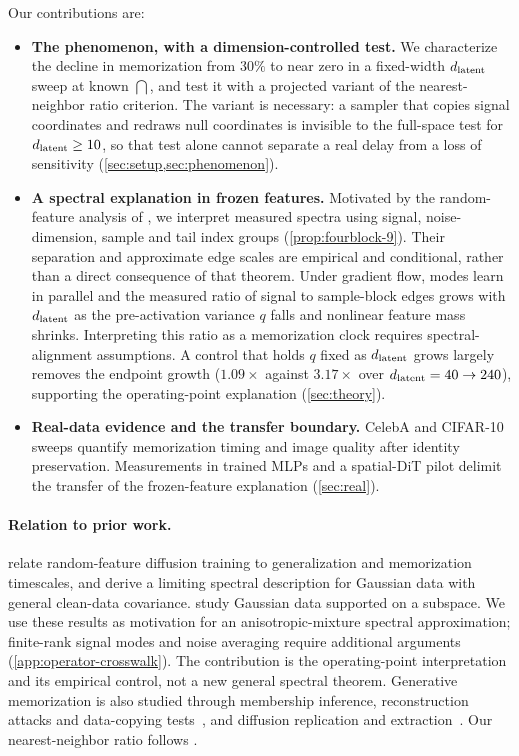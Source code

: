 Our contributions are:
\begin{itemize}
  \item \textbf{The phenomenon, with a dimension-controlled test.} We characterize the decline in memorization from $30\%$ to near zero in a fixed-width $d_{\mathrm{latent}}$ sweep at known $\dint$, and test it with a projected variant of the nearest-neighbor ratio criterion. The variant is necessary: a sampler that copies signal coordinates and redraws null coordinates is invisible to the full-space test for $d_{\mathrm{latent}}\ge10$, so that test alone cannot separate a real delay from a loss of sensitivity (\cref{sec:setup,sec:phenomenon}).
  \item \textbf{A spectral explanation in frozen features.} Motivated by the random-feature analysis of \citet{bonnaire2025}, we interpret measured spectra using signal, noise-dimension, sample and tail index groups (\cref{prop:fourblock-9}). Their separation and approximate edge scales are empirical and conditional, rather than a direct consequence of that theorem. Under gradient flow, modes learn in parallel and the measured ratio of signal to sample-block edges grows with $d_{\mathrm{latent}}$ as the pre-activation variance $q$ falls and nonlinear feature mass shrinks. Interpreting this ratio as a memorization clock requires spectral-alignment assumptions. A control that holds $q$ fixed as $d_{\mathrm{latent}}$ grows largely removes the endpoint growth ($1.09\times$ against $3.17\times$ over $d_{\mathrm{latent}}=40\to240$), supporting the operating-point explanation (\cref{sec:theory}).
  \item \textbf{Real-data evidence and the transfer boundary.} CelebA and CIFAR-10 sweeps quantify memorization timing and image quality after identity preservation. Measurements in trained MLPs and a spatial-DiT pilot delimit the transfer of the frozen-feature explanation (\cref{sec:real}).
\end{itemize}

\paragraph{Relation to prior work.}
\citet{bonnaire2025} relate random-feature diffusion training to generalization and memorization timescales, and derive a limiting spectral description for Gaussian data with general clean-data covariance. \citet{george2025dsm} study Gaussian data supported on a subspace. We use these results as motivation for an anisotropic-mixture spectral approximation; finite-rank signal modes and noise averaging require additional arguments (\cref{app:operator-crosswalk}). The contribution is the operating-point interpretation and its empirical control, not a new general spectral theorem. Generative memorization is also studied through membership inference, reconstruction attacks and data-copying tests~\citep{hayes2017logan,hilprecht2019reconstruction,meehan2020datacopying}, and diffusion replication and extraction~\citep{somepalli2023diffusion,carlini2023extracting}. Our nearest-neighbor ratio follows \citet{bonnaire2025}.